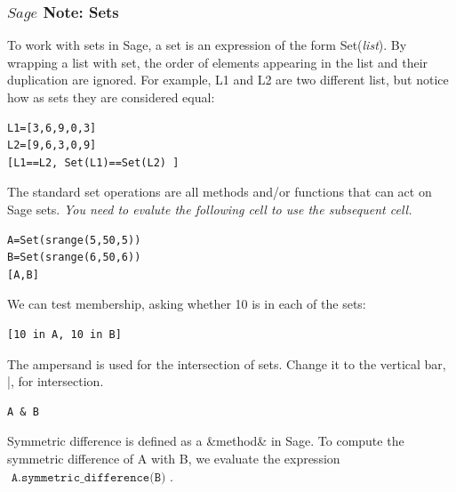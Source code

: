 \documentclass[10pt,]{book}
\theoremstyle{plain}
\theoremstyle{definition}
\begin{document}
\subsubsection[ \( Sage\) Note: Sets]{ \( Sage\) Note: Sets}\label{subsubsection-1}
To work with sets in Sage, a set is an expression of the form  Set(\emph{list}).  By wrapping a list with set, the order of elements appearing in the list and their duplication are ignored.  For example, L1 and L2 are two different list, but notice how as sets they are considered equal:%
\begin{lstlisting}[style=sageinput]
L1=[3,6,9,0,3]
L2=[9,6,3,0,9]
[L1==L2, Set(L1)==Set(L2) ]
\end{lstlisting}
\par
The standard set operations are all methods and/or functions that can act on Sage sets. \emph{You need to evalute the following cell to use the subsequent cell.}%
\begin{lstlisting}[style=sageinput]
A=Set(srange(5,50,5))
B=Set(srange(6,50,6))
[A,B]
\end{lstlisting}
\par

We can test membership, asking whether 10 is in each of the sets:
%
\begin{lstlisting}[style=sageinput]
[10 in A, 10 in B]
\end{lstlisting}
\par

The ampersand is used for the intersection of sets.  Change it to the vertical bar, |,  for intersection. 
%
\begin{lstlisting}[style=sageinput]
A & B
\end{lstlisting}
\par
Symmetric difference is defined as a &method& in Sage. To compute the symmetric difference of A  with  B, we evaluate the expression \(\texttt{ A.symmetric_difference(B) }\).%
\typeout{************************************************}
\typeout{************************************************}
\end{document}
